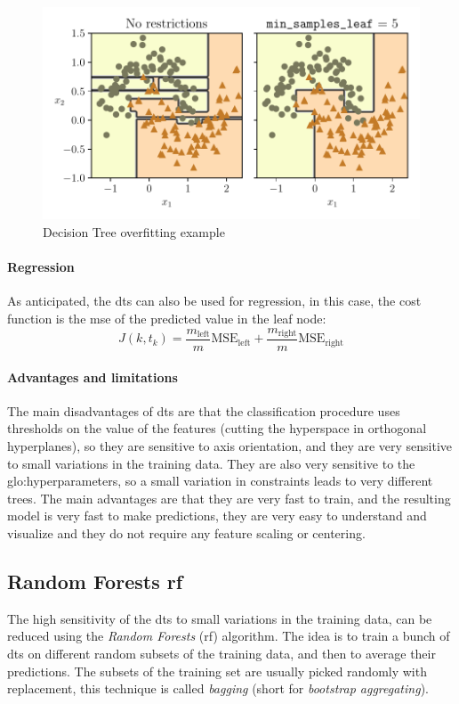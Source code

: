 \begin{figure}
    \centering
    \includegraphics{images/MachineLearning/DecisionTreeOverfitting.pdf}
    \caption{Decision Tree overfitting example }
    \label{fig:DecisionTreeOverfitting}
\end{figure}

\paragraph{Regression}
As anticipated, the \gls{dt}s can also be used for regression, in this case, the cost function is the \gls{mse} of the predicted value in the leaf node:
\begin{equation}
    J(k, t_k) = \frac{m_{\text{left}}}{m}\text{MSE}_{\text{left}} + \frac{m_{\text{right}}}{m}\text{MSE}_{\text{right}}
\end{equation}

\paragraph{Advantages and limitations}
The main disadvantages of \gls{dt}s are that the classification procedure uses thresholds on the value of the features (cutting the hyperspace in orthogonal hyperplanes), so they are sensitive to axis orientation, and they are very sensitive to small variations in the training data. They are also very sensitive to the \gls{glo:hyperparameter}s, so a small variation in constraints leads to very different trees. The main advantages are that they are very fast to train, and the resulting model is very fast to make predictions, they are very easy to understand and visualize and they do not require any feature scaling or centering.

\subsection{Random Forests \gls{rf}}
\label{subsec:rf}
The high sensitivity of the \gls{dt}s to small variations in the training data, can be reduced using the \emph{Random Forests} (\gls{rf}) algorithm. The idea is to train a bunch of \gls{dt}s on different random subsets of the training data, and then to average their predictions. The subsets of the training set are usually picked randomly with replacement, this technique is called \emph{bagging} (short for \emph{bootstrap aggregating}). 

